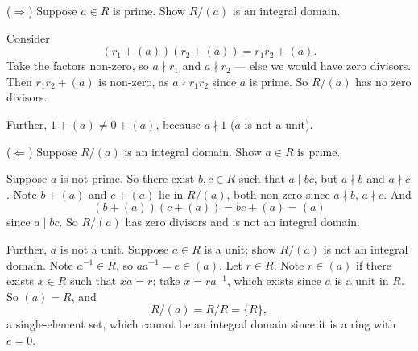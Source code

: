 \documentclass[11pt]{article}
\begin{document}
\begin{solution}
  ($\Rightarrow$) Suppose $a \in R$ is prime. Show $R/(a)$ is an integral
  domain.

  Consider
  \[
    (r_{1} + (a))(r_{2} + (a)) = r_{1}r_{2} + (a).
  \]
  Take the factors non-zero, so $a \nmid r_{1}$ and $a \nmid r_{2}$ --- else we
  would have zero divisors. Then $r_{1}r_{2} + (a)$ is non-zero, as
  $a \nmid r_{1}r_{2}$ since $a$ is prime. So $R/(a)$ has no zero divisors.

  Further, $1 + (a) \neq 0 + (a)$, because $a \nmid 1$ ($a$ is not a unit).

  ($\Leftarrow$) Suppose $R/(a)$ is an integral domain. Show $a \in R$ is
  prime.

  Suppose $a$ is not prime. So there exist $b, c \in R$ such that $a \mid bc$,
  but $a \nmid b$ and $a \nmid c$. Note $b + (a)$ and $c + (a)$ lie in
  $R/(a)$, both non-zero since $a \nmid b$, $a \nmid c$. And
  \[
    (b + (a))(c + (a)) = bc + (a) = (a)
  \]
  since $a \mid bc$. So $R/(a)$ has zero divisors and is not an integral
  domain.

  Further, $a$ is not a unit. Suppose $a \in R$ is a unit; show $R/(a)$ is not
  an integral domain. Note $a^{-1} \in R$, so $aa^{-1} = e \in (a)$. Let
  $r \in R$. Note $r \in (a)$ if there exists $x \in R$ such that $xa = r$;
  take $x = ra^{-1}$, which exists since $a$ is a unit in $R$. So $(a) = R$,
  and
  \[
    R/(a) = R/R = \{R\},
  \]
  a single-element set, which cannot be an integral domain since it is a ring
  with $e = 0$.
\end{solution}
\end{document}
